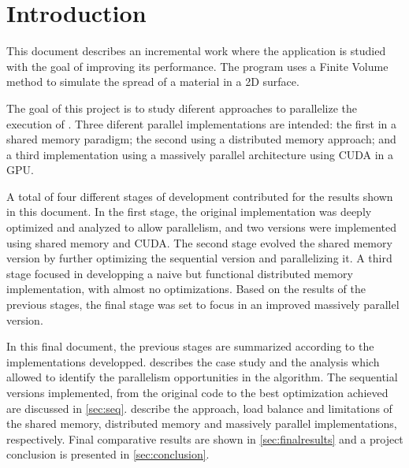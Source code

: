 \section{Introduction}




This document describes an incremental work where the \polu application is studied with the goal of improving its performance. The program uses a Finite Volume method to simulate the spread of a material in a 2D surface.

The goal of this project is to study diferent approaches to parallelize the execution of \polu. Three diferent parallel implementations are intended: the first in a shared memory paradigm; the second using a distributed memory approach; and a third implementation using a massively parallel architecture using CUDA in a GPU.

A total of four different stages of development contributed for the results shown in this document.
In the first stage, the original implementation was deeply optimized and analyzed to allow parallelism, and two versions were implemented using shared memory and CUDA.
The second stage evolved the shared memory version by further optimizing the sequential version and parallelizing it.
A third stage focused in developping a naive but functional distributed memory implementation, with almost no optimizations.
Based on the results of the previous stages, the final stage was set to focus in an improved massively parallel version.

In this final document, the previous stages are summarized according to the implementations developped.  describes the case study and the analysis which allowed to identify the parallelism opportunities in the algorithm. The sequential versions implemented, from the original code to the best optimization achieved are discussed in \cref{sec:seq}.  describe the approach, load balance and limitations of the shared memory, distributed memory and massively parallel implementations, respectively.
Final comparative results are shown in \cref{sec:finalresults} and a project conclusion is presented in \cref{sec:conclusion}.

